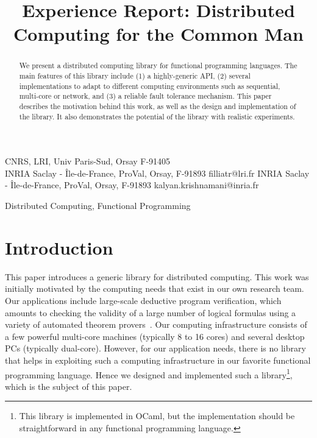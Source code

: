 \documentclass[preprint]{sigplanconf}
\newcommand{\Ocaml}{OCaml}
\begin{document}
\copyrightdata{[to be supplied]} 


\title{Experience Report: Distributed Computing for the Common Man}

           {CNRS, LRI, Univ Paris-Sud, Orsay F-91405\\
            INRIA Saclay - \^{I}le-de-France, ProVal, Orsay, F-91893}
           {filliatr@lri.fr}
           {INRIA Saclay - \^{I}le-de-France, ProVal, Orsay, F-91893}
           {kalyan.krishnamani@inria.fr}

\maketitle

\begin{abstract}
  We present a distributed computing library for
  functional programming languages. The main features of this library
  include (1) a highly-generic API, (2) several implementations to
  adapt to different computing environments such as sequential,
  multi-core or network, and (3) a reliable fault tolerance mechanism.
  This paper describes the motivation behind this work, as well as
  the design and implementation of the library. It also demonstrates
  the potential of the library with realistic experiments.
\end{abstract}


\terms
Distributed Computing, Functional Programming


\section{Introduction}

This paper introduces a generic library for distributed computing. This
work was initially motivated by the computing needs that exist in our
own research team. Our applications include large-scale deductive
program verification, which amounts to checking the validity of a
large number of logical formulas using a variety of automated theorem
provers~\cite{filliatre07cav}. Our computing infrastructure consists
of a few powerful multi-core machines (typically 8 to 16 cores) and
several desktop PCs (typically dual-core). However, for our
application needs, there is no library that helps in exploiting such a
computing infrastructure in our favorite functional programming
language.  Hence we designed and implemented such a
library\footnote{This library is implemented in \Ocaml, but the
  implementation should be straightforward in any functional
  programming language.}, which is the subject of this paper.
\end{document}
